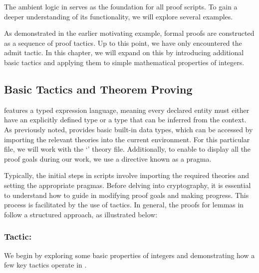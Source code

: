 The ambient logic in \EasyCrypt serves as the foundation for all proof scripts. To gain a deeper understanding of its functionality, we will explore several examples. 

As demonstrated in the earlier motivating example, formal proofs are constructed as a sequence of proof tactics. Up to this point, we have only encountered the admit tactic. In this chapter, we will expand on this by introducing additional basic tactics and applying them to simple mathematical properties of integers.

\subsection{Basic Tactics and Theorem Proving}
\EasyCrypt features a typed expression language, meaning every declared entity must either have an explicitly defined type or a type that can be inferred from the context. As previously noted, \EasyCrypt provides basic built-in data types, which can be accessed by importing the relevant theories into the current environment. For this particular file, we will work with the `' theory file. Additionally, to enable \EasyCrypt to display all the proof goals during our work, we use a directive known as a pragma.\\

Typically, the initial steps in \EasyCrypt scripts involve importing the required theories and setting the appropriate pragmas. Before delving into cryptography, it is essential to understand how to guide \EasyCrypt in modifying proof goals and making progress. This process is facilitated by the use of tactics. In general, the proofs for lemmas in \EasyCrypt follow a structured approach, as illustrated below:\\

\subsubsection{Tactic: }
We begin by exploring some basic properties of integers and demonstrating how a few key tactics operate in \EasyCrypt.


